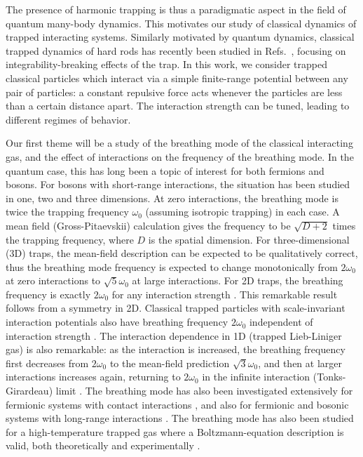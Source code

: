 \documentclass[onecolumn,pra]{revtex4-1}
\begin{document}
The presence of harmonic trapping is thus a paradigmatic aspect in the field of quantum many-body
dynamics.  This motivates our study of classical dynamics of trapped interacting systems.  Similarly
motivated by quantum dynamics, classical trapped dynamics of hard rods has recently been studied in
Refs.\ \cite{DoyonSpohn_JSTAT17, Moore_arXiv17.10}, focusing on integrability-breaking effects of
the trap.  In this work, we consider trapped classical particles which interact via a simple
finite-range potential between any pair of particles: a constant repulsive force acts whenever the
particles are less than a certain distance apart.  The interaction strength can be tuned, leading to
different regimes of behavior.

Our first theme will be a study of the breathing mode of the classical interacting gas, and the
effect of interactions on the frequency of the breathing mode.  In the quantum case, this has long
been a topic of interest for both fermions and bosons.  For bosons with short-range interactions,
the situation has been studied in one, two and three dimensions.  At zero interactions, the
breathing mode is twice the trapping frequency $\omega_0$ (assuming isotropic trapping) in each
case.  A mean field (Gross-Pitaevskii) calculation gives the frequency to be $\sqrt{D+2}$ times the
trapping frequency, where $D$ is the spatial dimension.  For three-dimensional (3D) traps, the
mean-field description can be expected to be qualitatively correct, thus the breathing mode
frequency is expected to change monotonically from $2\omega_0$ at zero interactions to
$\sqrt{5}\omega_0$ at large interactions.  For 2D traps, the breathing frequency is exactly
$2\omega_0$ for any interaction strength \cite{PitaevskiiRosch_PRA97}.  This remarkable result
follows from a symmetry in 2D.  Classical trapped particles with scale-invariant interaction
potentials also have breathing frequency $2\omega_0$ independent of interaction strength
\cite{PitaevskiiRosch_PRA97}.  The interaction dependence in 1D (trapped Lieb-Liniger gas) is also
remarkable: as the interaction is increased, the breathing frequency first decreases from
$2\omega_0$ to the mean-field prediction $\sqrt{3}\omega_0$, and then at larger interactions
increases again, returning to $2\omega_0$ in the infinite interaction (Tonks-Girardeau) limit
\cite{Naegerl_Science2009, Tschischik_BHbreathing_PRA_2013, 1D_breathing_mode_recent,
  Bouchoule_PRL2014, KroenkeSchmelcher_BM}.
%
The breathing mode has also been investigated extensively for fermionic systems with contact
interactions \cite{GrimmSmith_unitaryfermions_PRA08, fermion2Dbreathing,
  Stringari_lowDcollective_PRA15}, and also for fermionic and bosonic systems with long-range
interactions \cite{br_mode_long_range_interactions, Bonitz_Review}.  The breathing mode has also
been studied for a high-temperature trapped gas where a Boltzmann-equation description is valid,
both theoretically \cite{Guery-Odelin1999} and experimentally
\cite{Cornell_classsical_3Dexpt_NatPhys15}.
\end{document}
